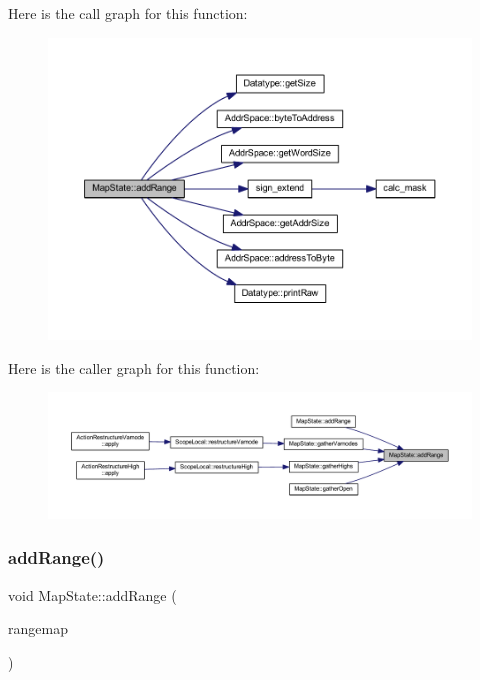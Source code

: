 Here is the call graph for this function\+:
\nopagebreak
\begin{figure}[H]
\begin{center}
\leavevmode
\includegraphics[width=350pt]{class_map_state_a89375399460ed36e13fbc9518ae7dad7_cgraph}
\end{center}
\end{figure}
Here is the caller graph for this function\+:
\nopagebreak
\begin{figure}[H]
\begin{center}
\leavevmode
\includegraphics[width=350pt]{class_map_state_a89375399460ed36e13fbc9518ae7dad7_icgraph}
\end{center}
\end{figure}
\mbox{\label{class_map_state_a0ed32adc04fe0dc1edbbdc63ee693481}} 
\subsubsection{\texorpdfstring{addRange()}{addRange()}\hspace{0.1cm}{\footnotesize\ttfamily [2/2]}}
{\footnotesize\ttfamily void Map\+State\+::add\+Range (\begin{DoxyParamCaption}\item[{const \mbox{\hyperlink{database_8hh_a44a8ea0c0009b316b2651d374e5d4260}{Entry\+Map}} $\ast$}]{rangemap }\end{DoxyParamCaption})}



